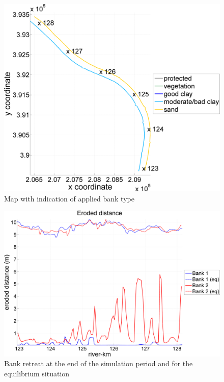 \begin{figure}
\includegraphics[width=\textwidth]{figures/Fig2-12.png}
\caption{Map with indication of applied bank type}
\label{Fig2.12}
\end{figure}

\begin{figure}
\includegraphics[width=\textwidth]{figures/Fig2-13.png}
\caption{Bank retreat at the end of the simulation period and for the equilibrium situation}
\label{Fig2.13}
\end{figure}
